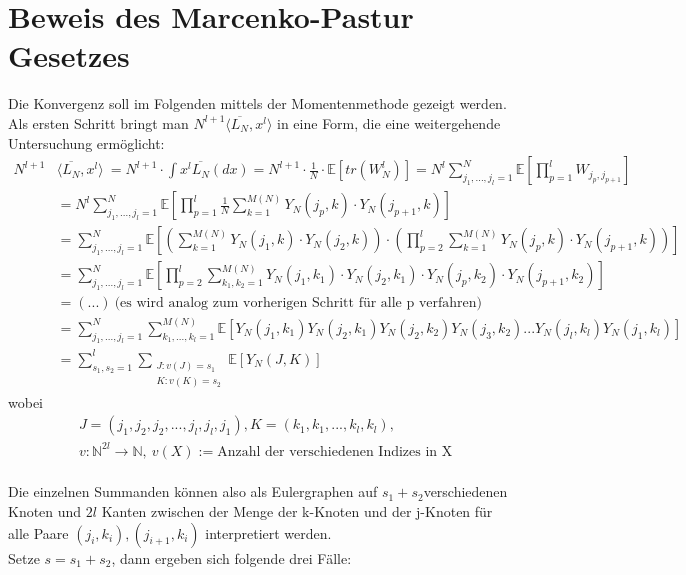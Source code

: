 \documentclass[a4paper, 11pt]{scrreprt}
\newcommand{\EE}{\mathbb{E}}
\newcommand{\NN}{\mathbb{N}}
\begin{document}
\section{Beweis des Marcenko-Pastur Gesetzes}
Die Konvergenz soll im Folgenden mittels der Momentenmethode gezeigt werden. Als ersten Schritt bringt man \(N^{l+1} \langle \overline{L_N}, x^l \rangle\) in eine Form, die eine weitergehende Untersuchung ermöglicht:
\begin{equation}
\begin{split}
		N^{l+1} &\langle \overline{L_N}, x^l \rangle\ 
		= N^{l+1} \cdot \int x^l \overline{L_N}(dx) 
		= N^{l+1} \cdot \frac{1}{N} \cdot \EE[tr(W^l_N)] 
		= N^l \sum_{j_1,...,j_l = 1}^N \EE\left[\prod_{p = 1}^l W_{j_p,j_{p+1}}\right] \\
		&= N^l \sum_{j_1,...,j_l = 1}^N \EE\left[\prod_{p = 1}^l \frac{1}{N} \sum_{k = 1}^{M(N)} Y_N(j_p,k) \cdot Y_N(j_{p+1},k) \right] \\
		&= \sum_{j_1,...,j_l = 1}^N \EE \left[\left(\sum_{k = 1}^{M(N)} Y_N(j_1,k) \cdot Y_N(j_2,k)\right) \cdot \left(\prod_{p = 2}^l \sum_{k = 1}^{M(N)} Y_N(j_p,k) \cdot Y_N(j_{p+1},k) \right) \right] \\
		&= \sum_{j_1,...,j_l = 1}^N \EE\left[	\prod_{p = 2}^l \sum_{k_1,k_2 = 1}^{M(N)} Y_N(j_1,k_1) \cdot Y_N(j_2,k_1) \cdot Y_N(j_p,k_2) \cdot Y_N(j_{p+1},k_2) \right] \\
		&= (...)~ \text{(es wird analog zum vorherigen Schritt für alle p verfahren)}  \\
		&= \sum_{j_1,...,j_l = 1}^N \sum_{k_1,...,k_l = 1}^{M(N)} \EE[Y_N(j_1,k_1) Y_N(j_2,k_1) Y_N(j_2,k_2) Y_N(j_3,k_2) ... Y_N(j_l,k_l) Y_N(j_1,k_l)]\\
 &= \sum_{s_1,s_2 = 1}^l \sum_{\substack{J:v(J)=s_1\\ K:v(K)=s_2 }} \EE[Y_N(J,K)]
\end{split}
\end{equation}
wobei 
\begin{align*}
	&J=(j_1,j_2,j_2,...,j_l,j_l,j_1), K=(k_1,k_1,...,k_l,k_l),\\
	&v: \NN^{2l}\to \NN,\ v(X) := \text{Anzahl der verschiedenen Indizes in X}
\end{align*}
\\
Die einzelnen Summanden können also als Eulergraphen auf \(s_1+s_2 \)verschiedenen Knoten und \(2l\) Kanten zwischen der Menge der k-Knoten und der j-Knoten für alle Paare $ (j_i, k_i), (j_{i+1},k_i) $ interpretiert werden.\\
Setze \(s = s_1+s_2\), dann ergeben sich folgende drei Fälle:
\end{document}
